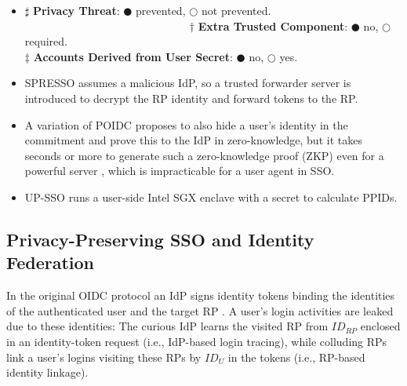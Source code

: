 \begin{table}[tb]
{}
    \label{tbl:comparison-protocol}
{
\begin{itemize}
\item[]
${\sharp}$ \textbf{Privacy Threat}: $\CIRCLE$ prevented, $\Circle$ not prevented.
\ \ \ \ \ \ \ \ \ \ \ \ \ \ \ \ \ \ \ \ \ \ \ \ \ \ \ \ \ \ ${\dag}$ \textbf{Extra Trusted Component}: $\CIRCLE$ no, $\Circle$ required.\\
${\ddag}$ \textbf{Accounts Derived from User Secret}: $\CIRCLE$ no, $\Circle$ yes.

\item[1.]
SPRESSO assumes a malicious IdP, so a trusted forwarder server is introduced to decrypt the RP identity and forward tokens to the RP.

\item[2.]
A variation of POIDC \cite{POIDC} proposes to also hide a user's identity in the commitment and prove this to the IdP in zero-knowledge,
        but it takes seconds or more to generate such a zero-knowledge proof (ZKP) even for a powerful server \cite{ZKP-BINF,zkp-benchmark,ZKP-GPU},
        which is impracticable for a user agent in SSO.
\item[3.]
UP-SSO \cite{up-sso} runs a user-side Intel SGX enclave with a secret to calculate PPIDs.
%
\end{itemize}}
\end{table}

\subsection{Privacy-Preserving SSO and Identity Federation}
\label{subsec-solutions}
In the original OIDC protocol 
    an IdP signs identity tokens binding the identities of the authenticated user and the target RP \cite{OpenIDConnect,rfc6749}.
A user's login activities are leaked due to these identities:
        The curious IdP learns the visited RP from $ID_{RP}$ enclosed in an identity-token request (i.e., IdP-based login tracing),
        while colluding RPs link a user's logins visiting these RPs by $ID_{U}$ in the tokens (i.e., RP-based identity linkage).


